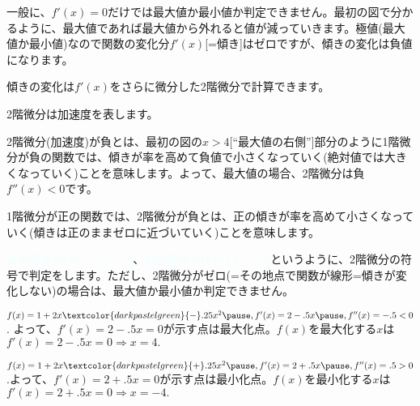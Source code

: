 \begin{frame}[t]{}
\begin{dinglist}{45}
\vspace{1.0ex}\setlength{\itemsep}{1.0ex}\setlength{\baselineskip}{12pt}
\item	一般に、$f'(x)=0$だけでは最大値か最小値か判定できません。最初の図で分かるように、最大値であれば最大値から外れると値が減っていきます。極値(最大値か最小値)なので関数の変化分$f'(x)$[=傾き]はゼロですが、傾きの変化は負値になります。
\pause
\item	傾きの変化は$f'(x)$をさらに微分した2階微分で計算できます。
	\begin{dinglist}{43}
	\vspace{1.0ex}\setlength{\itemsep}{1.0ex}\setlength{\baselineskip}{12pt}
\pause
	\item	2階微分は加速度を表します。
\pause
	\item	2階微分(加速度)が負とは、最初の図の$x>4$[``最大値の右側'']部分のように1階微分が負の関数では、傾きが率を高めて負値で小さくなっていく(絶対値では大きくなっていく)ことを意味します。よって、最大値の場合、2階微分は負$f''(x)<0$です。
\pause
	\item	1階微分が正の関数では、2階微分が負とは、正の傾きが率を高めて小さくなっていく(傾きは正のままゼロに近づいていく)ことを意味します。
	\end{dinglist}
\pause
\item	\textcolor{azure}{最大値ならば$f''(x)<0$}、\textcolor{azure}{最小値ならば$f''(x)>0$}というように、2階微分の符号で判定をします。ただし、2階微分がゼロ(=その地点で関数が線形=傾きが変化しない)の場合は、最大値か最小値か判定できません。
\end{dinglist}
\end{frame}

\begin{frame}[t]{}
\begin{dinglist}{43}
\vspace{1.0ex}\setlength{\itemsep}{1.0ex}\setlength{\baselineskip}{12pt}
\pause
\item	$f(x)=1+2x\textcolor{darkpastelgreen}{-}.25x^{2}\pause , f'(x)=2-.5x\pause , f''(x)=-.5<0$. \pause よって、$f'(x)=2-.5x=0$が示す点は最\textcolor{darkpastelgreen}{大}化点。\pause $f(x)$を最大化する$x$は$f'(x)=2-.5x=0 \Rightarrow x=4.$
\pause
\item	$f(x)=1+2x\textcolor{darkpastelgreen}{+}.25x^{2}\pause , f'(x)=2+.5x\pause , f''(x)=.5>0$.\pause  よって、$f'(x)=2+.5x=0$が示す点は最\textcolor{darkpastelgreen}{小}化点。\pause $f(x)$を最小化する$x$は$f'(x)=2+.5x=0 \Rightarrow x=-4.$
\end{dinglist}
\end{frame}

